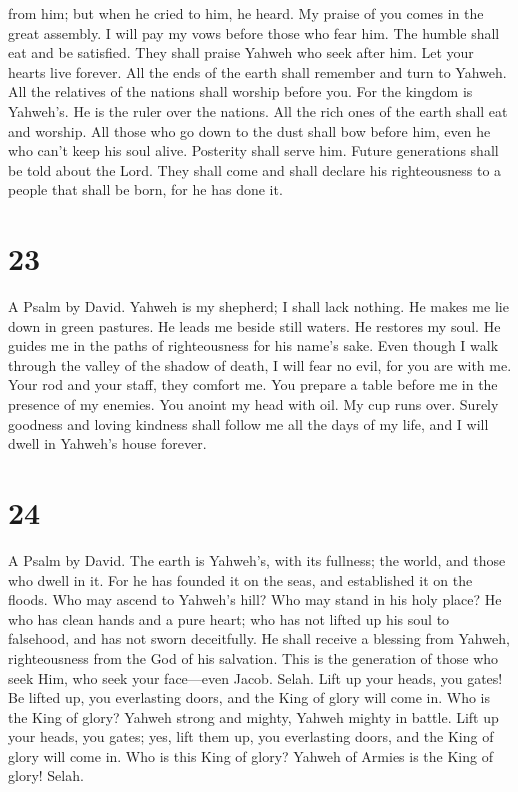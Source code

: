 from him; but when he cried to him, he heard.  My praise
of you comes in the great assembly. I will pay my vows before those who
fear him.  The humble shall eat and be satisfied. They
shall praise Yahweh who seek after him. Let your hearts live forever.
 All the ends of the earth shall remember and turn to
Yahweh. All the relatives of the nations shall worship before you.
 For the kingdom is Yahweh's. He is the ruler over the
nations.  All the rich ones of the earth shall eat and
worship. All those who go down to the dust shall bow before him, even he
who can't keep his soul alive.  Posterity shall serve
him. Future generations shall be told about the Lord. 
They shall come and shall declare his righteousness to a people that
shall be born, for he has done it.

\hypertarget{section-22}{%
\section{23}\label{section-22}}

A Psalm by David.  Yahweh is my shepherd; I shall lack
nothing.  He makes me lie down in green pastures. He leads
me beside still waters.  He restores my soul. He guides me
in the paths of righteousness for his name's sake.  Even
though I walk through the valley of the shadow of death, I will fear no
evil, for you are with me. Your rod and your staff, they comfort me.
 You prepare a table before me in the presence of my
enemies. You anoint my head with oil. My cup runs over. 
Surely goodness and loving kindness shall follow me all the days of my
life, and I will dwell in Yahweh's house forever.

\hypertarget{section-23}{%
\section{24}\label{section-23}}

A Psalm by David.  The earth is Yahweh's, with its
fullness; the world, and those who dwell in it.  For he
has founded it on the seas, and established it on the floods.
 Who may ascend to Yahweh's hill? Who may stand in his
holy place?  He who has clean hands and a pure heart; who
has not lifted up his soul to falsehood, and has not sworn deceitfully.
 He shall receive a blessing from Yahweh, righteousness
from the God of his salvation.  This is the generation of
those who seek Him, who seek your face---even Jacob. Selah.
 Lift up your heads, you gates! Be lifted up, you
everlasting doors, and the King of glory will come in. 
Who is the King of glory? Yahweh strong and mighty, Yahweh mighty in
battle.  Lift up your heads, you gates; yes, lift them up,
you everlasting doors, and the King of glory will come in.
 Who is this King of glory? Yahweh of Armies is the King
of glory! Selah.

